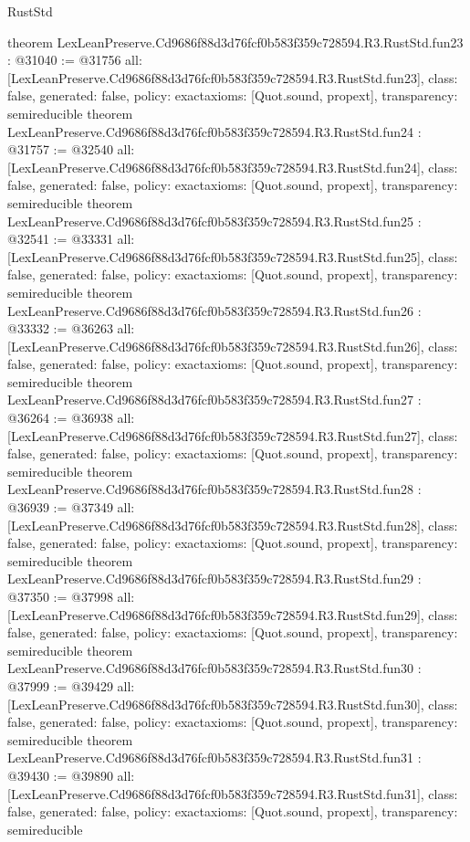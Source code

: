 \begin{lexlean}{RustStd}
\begin{coremodule}
{}
theorem LexLeanPreserve.Cd9686f88d3d76fcf0b583f359c728594.R3.RustStd.fun23 : @31040 := @31756 {
  all: [LexLeanPreserve.Cd9686f88d3d76fcf0b583f359c728594.R3.RustStd.fun23],
  class: false,
  generated: false,
  policy: exact{axioms: [Quot.sound, propext]},
  transparency: semireducible
}
theorem LexLeanPreserve.Cd9686f88d3d76fcf0b583f359c728594.R3.RustStd.fun24 : @31757 := @32540 {
  all: [LexLeanPreserve.Cd9686f88d3d76fcf0b583f359c728594.R3.RustStd.fun24],
  class: false,
  generated: false,
  policy: exact{axioms: [Quot.sound, propext]},
  transparency: semireducible
}
theorem LexLeanPreserve.Cd9686f88d3d76fcf0b583f359c728594.R3.RustStd.fun25 : @32541 := @33331 {
  all: [LexLeanPreserve.Cd9686f88d3d76fcf0b583f359c728594.R3.RustStd.fun25],
  class: false,
  generated: false,
  policy: exact{axioms: [Quot.sound, propext]},
  transparency: semireducible
}
theorem LexLeanPreserve.Cd9686f88d3d76fcf0b583f359c728594.R3.RustStd.fun26 : @33332 := @36263 {
  all: [LexLeanPreserve.Cd9686f88d3d76fcf0b583f359c728594.R3.RustStd.fun26],
  class: false,
  generated: false,
  policy: exact{axioms: [Quot.sound, propext]},
  transparency: semireducible
}
theorem LexLeanPreserve.Cd9686f88d3d76fcf0b583f359c728594.R3.RustStd.fun27 : @36264 := @36938 {
  all: [LexLeanPreserve.Cd9686f88d3d76fcf0b583f359c728594.R3.RustStd.fun27],
  class: false,
  generated: false,
  policy: exact{axioms: [Quot.sound, propext]},
  transparency: semireducible
}
theorem LexLeanPreserve.Cd9686f88d3d76fcf0b583f359c728594.R3.RustStd.fun28 : @36939 := @37349 {
  all: [LexLeanPreserve.Cd9686f88d3d76fcf0b583f359c728594.R3.RustStd.fun28],
  class: false,
  generated: false,
  policy: exact{axioms: [Quot.sound, propext]},
  transparency: semireducible
}
theorem LexLeanPreserve.Cd9686f88d3d76fcf0b583f359c728594.R3.RustStd.fun29 : @37350 := @37998 {
  all: [LexLeanPreserve.Cd9686f88d3d76fcf0b583f359c728594.R3.RustStd.fun29],
  class: false,
  generated: false,
  policy: exact{axioms: [Quot.sound, propext]},
  transparency: semireducible
}
theorem LexLeanPreserve.Cd9686f88d3d76fcf0b583f359c728594.R3.RustStd.fun30 : @37999 := @39429 {
  all: [LexLeanPreserve.Cd9686f88d3d76fcf0b583f359c728594.R3.RustStd.fun30],
  class: false,
  generated: false,
  policy: exact{axioms: [Quot.sound, propext]},
  transparency: semireducible
}
theorem LexLeanPreserve.Cd9686f88d3d76fcf0b583f359c728594.R3.RustStd.fun31 : @39430 := @39890 {
  all: [LexLeanPreserve.Cd9686f88d3d76fcf0b583f359c728594.R3.RustStd.fun31],
  class: false,
  generated: false,
  policy: exact{axioms: [Quot.sound, propext]},
  transparency: semireducible
}
\end{coremodule}
\end{lexlean}
